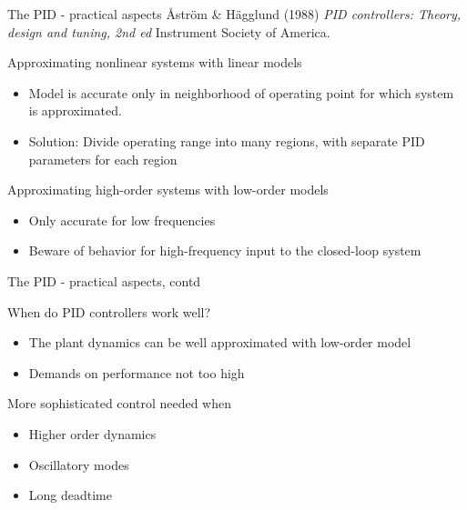 \documentclass[presentation,aspectratio=169, usenames, dvipsnames]{beamer}
\begin{document}
\begin{frame}[label={sec:org879c25a}]{The PID - practical aspects}
{\footnotesize Åström \& Hägglund (1988) \emph{PID controllers: Theory, design and tuning, 2nd ed} Instrument Society of America.}

\begin{block}{Approximating nonlinear systems with linear models}
\begin{itemize}
\item Model is accurate only in neighborhood of operating point for which system is approximated.
\item Solution: Divide operating range into many regions, with separate PID parameters for each region
\end{itemize}
\end{block}

\begin{block}{Approximating high-order systems with low-order models}
\begin{itemize}
\item Only accurate for low frequencies
\item Beware of behavior for high-frequency input to the closed-loop system
\end{itemize}
\end{block}
\end{frame}

\begin{frame}[label={sec:org2090f62}]{The PID - practical aspects, contd}
\begin{block}{When do PID controllers work well?}
\begin{itemize}
\item The plant dynamics can be well approximated with low-order model
\item Demands on performance not too high
\end{itemize}
\end{block}
\begin{block}{More sophisticated control needed when}
\begin{itemize}
\item Higher order dynamics
\item Oscillatory modes
\item Long deadtime
\end{itemize}
\end{block}
\end{frame}
\end{document}
